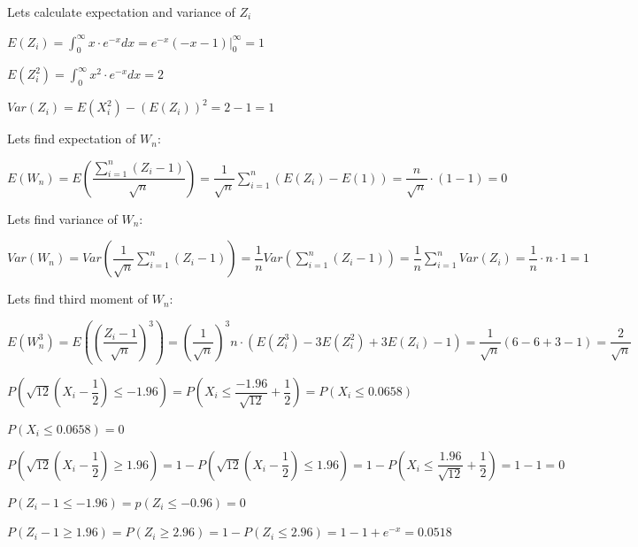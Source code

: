 \documentclass[12pt]{article}
\begin{document}
\begin{list}{()~}{}
\medskip

Lets calculate expectation and variance of $Z_i$

$E\left(Z_i\right)=\int_0^{\infty}x\cdot e^{-x}dx = e^{-x}\left(-x-1\right)\vert_0^{\infty}=1$

$E\left(Z_i^2\right)=\int_0^{\infty}x^2\cdot e^{-x}dx = 2$

$Var\left(Z_i\right)=E\left(X_i^2\right)-\left(E\left(Z_i\right)\right)^2=2-1=1$

\medskip

Lets find expectation of $W_n$:

$E\left(W_n\right)=E\left(\dfrac{\sum_{i=1}^n\left(Z_i-1\right)}{\sqrt{n}}\right)=\dfrac{1}{\sqrt{n}}\sum_{i=1}^n\left(E\left(Z_i\right)-E\left(1\right)\right) = \dfrac{n}{\sqrt{n}}\cdot \left(1-1\right)=0$

\medskip

Lets find variance of $W_n$:

$Var\left(W_n\right)=Var\left(\dfrac{1}{\sqrt{n}}\sum_{i=1}^n\left(Z_i-1\right)\right)=\dfrac{1}{n}Var\left(\sum_{i=1}^n\left(Z_i-1\right)\right)=\dfrac{1}{n}\sum_{i=1}^n Var\left(Z_i\right)=\dfrac{1}{n}\cdot n \cdot 1 = 1$

\medskip 

Lets find third moment of $W_n$:

$E\left(W_n^3\right)=E\left(\left(\dfrac{Z_i-1}{\sqrt{n}}\right)^3\right)=\left(\dfrac{1}{\sqrt{n}}\right)^3n\cdot \left(E\left(Z_i^3\right)-3E\left(Z_i^2\right) + 3E\left(Z_i\right)-1\right)=\dfrac{1}{\sqrt{n}}\left(6-6+3-1\right)=\dfrac{2}{\sqrt{n}}$

\item 
{}
\begin{list}{)~}{}
\item $P\left(\sqrt{12}\left(X_i-\dfrac{1}{2}\right)\leq -1.96\right)=P\left(X_i \leq \dfrac{-1.96}{\sqrt{12}}+\dfrac{1}{2}\right)=P\left(X_i\leq 0.0658\right)$

$P\left(X_i\leq 0.0658\right) = 0$

\item $P\left(\sqrt{12}\left(X_i-\dfrac{1}{2}\right)\geq 1.96\right)=1-P\left(\sqrt{12}\left(X_i-\dfrac{1}{2}\right)\leq 1.96\right)=1-P\left(X_i \leq \dfrac{1.96}{\sqrt{12}}+\dfrac{1}{2}\right)=1-1=0$

\item $P\left(Z_i-1\leq -1.96\right)=p\left(Z_i \leq -0.96\right) = 0$

\item $P\left(Z_i-1\geq 1.96\right)=P\left(Z_i\geq 2.96\right)=1-P\left(Z_i\leq 2.96\right)=1-1+e^{-x}=0.0518$
\end{list}


\end{list}
\end{document}
